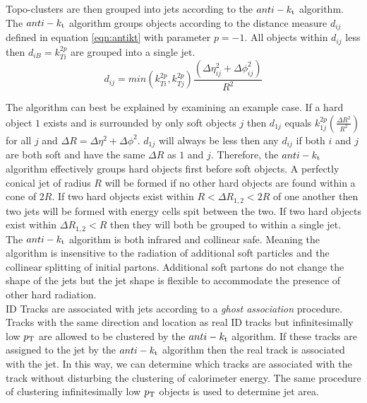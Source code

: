 \indent Topo-clusters are then grouped into jets according to the $anti-k_{\rm{t}}$ algorithm.  The $anti-k_{\rm{t}}$ algorithm groups objects according to the distance measure $d_{ij}$ defined in equation \ref{eqn:antikt} with parameter $p=-1$.  All objects within $d_{ij}$ less then $d_{iB}=k^{2p}_{Ti}$ are grouped into a single jet.  \\

\begin{equation}
d_{ij} = min ( k^{2p}_{Ti}, k^{2p}_{Tj} ) \frac{(\Delta\eta^2_{ij} + \Delta\phi^2_{ij})}{R^2}
\label{eqn:PileupDensity}
\end{equation}

\indent  The algorithm can best be explained by examining an example case.  If a hard object $1$ exists and is surrounded by only soft objects $j$ then $d_{1j}$ equals $k^{2p}_{1j}(\frac{\Delta R^2}{R^2})$ for all $j$ and $\Delta R = \Delta \eta^2 + \Delta \phi^2$.  $d_{1j}$ will always be less then any $d_{ij}$ if both $i$ and $j$ are both soft and have the same $\Delta R$ as $1$ and $j$.  Therefore, the $anti-k_{\rm{t}}$ algorithm effectively groups hard objects first before soft objects.  A perfectly conical jet of radius $R$ will be formed if no other hard objects are found within a cone of $2R$.  If two hard objects exist within $R<\Delta R_{1,2}<2R$ of one another then two jets will be formed with energy cells spit between the two.  If two hard objects exist within $\Delta R_{1,2}<R$ then they will both be grouped to within a single jet. \\

\indent  The $anti-k_{\rm{t}}$ algorithm is both infrared and collinear safe.  Meaning the algorithm is insensitive to the radiation of additional soft particles and the collinear splitting of initial partons.  Additional soft partons do not change the shape of the jets but the jet shape is flexible to accommodate the presence of other hard radiation. \\

\indent ID Tracks are associated with jets according to a {\it ghost association} procedure.\cite{JetAreaGhostAssociate}  Tracks with the same direction and location as real ID tracks but infinitesimally low $p_{\mathrm{T}}$ are allowed to be clustered by the $anti-k_{\rm{t}}$ algorithm.  If these tracks are assigned to the jet by the $anti-k_{\rm{t}}$ algorithm then the real track is associated with the jet.  In this way, we can determine which tracks are associated with the track without disturbing the clustering of calorimeter energy.  The same procedure of clustering infinitesimally low $p_{\mathrm{T}}$ objects is used to determine jet area. \\

